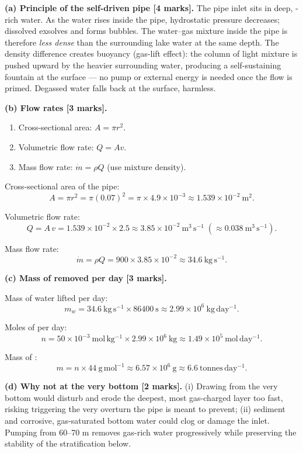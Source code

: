 \documentclass[11pt]{article}
\begin{document}
\begin{corrige}
\textbf{(a) Principle of the self-driven pipe [4 marks].} The pipe inlet sits in deep, -rich water. As the water rises inside the pipe, hydrostatic pressure decreases; dissolved  exsolves and forms bubbles. The water–gas mixture inside the pipe is therefore \emph{less dense} than the surrounding lake water at the same depth. The density difference creates buoyancy (gas-lift effect): the column of light mixture is pushed upward by the heavier surrounding water, producing a self-sustaining fountain at the surface — no pump or external energy is needed once the flow is primed. Degassed water falls back at the surface, harmless.

\textbf{(b) Flow rates [3 marks].}

\begin{methode}
\begin{enumerate}
\item Cross-sectional area: $A = \pi r^2$.
\item Volumetric flow rate: $Q = A v$.
\item Mass flow rate: $\dot{m} = \rho Q$ (use mixture density).
\end{enumerate}
\end{methode}

Cross-sectional area of the pipe:
\[ A = \pi r^2 = \pi (0.07)^2 = \pi \times 4.9\times 10^{-3} \approx 1.539\times 10^{-2}\ \mathrm{m^2}. \]

Volumetric flow rate:
\[ Q = A\,v = 1.539\times 10^{-2} \times 2.5 \approx 3.85\times 10^{-2}\ \mathrm{m^3\,s^{-1}} \;(\approx 0.038\ \mathrm{m^3\,s^{-1}}). \]

Mass flow rate:
\[ \dot{m} = \rho Q = 900 \times 3.85\times 10^{-2} \approx 34.6\ \mathrm{kg\,s^{-1}}. \]

\textbf{(c) Mass of  removed per day [3 marks].}

Mass of water lifted per day:
\[ m_{w} = 34.6\ \mathrm{kg\,s^{-1}} \times 86400\ \mathrm{s} \approx 2.99\times 10^{6}\ \mathrm{kg\,day^{-1}}. \]

Moles of  per day:
\[ n = 50\times 10^{-3}\ \mathrm{mol\,kg^{-1}} \times 2.99\times 10^{6}\ \mathrm{kg} \approx 1.49\times 10^{5}\ \mathrm{mol\,day^{-1}}. \]

Mass of :
\[ m = n \times 44\ \mathrm{g\,mol^{-1}} \approx 6.57\times 10^{6}\ \mathrm{g} \approx 6.6\ \mathrm{tonnes\,day^{-1}}. \]

\textbf{(d) Why not at the very bottom [2 marks].} (i) Drawing from the very bottom would disturb and erode the deepest, most gas-charged layer too fast, risking triggering the very overturn the pipe is meant to prevent; (ii) sediment and corrosive, gas-saturated bottom water could clog or damage the inlet. Pumping from 60–70 m removes gas-rich water progressively while preserving the stability of the stratification below.
\end{corrige}
\end{document}
